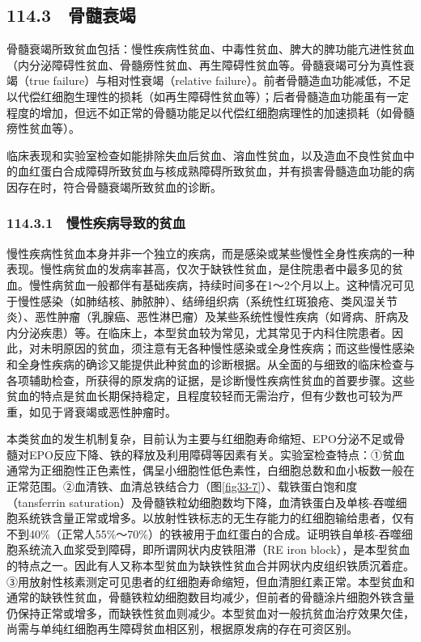 \subsection{114.3　骨髓衰竭}

骨髓衰竭所致贫血包括：慢性疾病性贫血、中毒性贫血、脾大的脾功能亢进性贫血（内分泌障碍性贫血、骨髓痨性贫血、再生障碍性贫血等。骨髓衰竭可分为真性衰竭（true
failure）与相对性衰竭（relative
failure）。前者骨髓造血功能减低，不足以代偿红细胞生理性的损耗（如再生障碍性贫血等）；后者骨髓造血功能虽有一定程度的增加，但远不如正常的骨髓功能足以代偿红细胞病理性的加速损耗（如骨髓痨性贫血等）。

临床表现和实验室检查如能排除失血后贫血、溶血性贫血，以及造血不良性贫血中的血红蛋白合成障碍所致贫血与核成熟障碍所致贫血，并有损害骨髓造血功能的病因存在时，符合骨髓衰竭所致贫血的诊断。

\subsubsection{114.3.1　慢性疾病导致的贫血}

慢性疾病性贫血本身并非一个独立的疾病，而是感染或某些慢性全身性疾病的一种表现。慢性病贫血的发病率甚高，仅次于缺铁性贫血，是住院患者中最多见的贫血。慢性病贫血一般都伴有基础疾病，持续时间多在1～2个月以上。这种情况可见于慢性感染（如肺结核、肺脓肿）、结缔组织病（系统性红斑狼疮、类风湿关节炎）、恶性肿瘤（乳腺癌、恶性淋巴瘤）及某些系统性慢性疾病（如肾病、肝病及内分泌疾患）等。在临床上，本型贫血较为常见，尤其常见于内科住院患者。因此，对未明原因的贫血，须注意有无各种慢性感染或全身性疾病；而这些慢性感染和全身性疾病的确诊又能提供此种贫血的诊断根据。从全面的与细致的临床检查与各项辅助检查，所获得的原发病的证据，是诊断慢性疾病性贫血的首要步骤。这些贫血的特点是贫血长期保持稳定，且程度较轻而无需治疗，但有少数也可较为严重，如见于肾衰竭或恶性肿瘤时。

本类贫血的发生机制复杂，目前认为主要与红细胞寿命缩短、EPO分泌不足或骨髓对EPO反应下降、铁的释放及利用障碍等因素有关。实验室检查特点：①贫血通常为正细胞性正色素性，偶呈小细胞性低色素性，白细胞总数和血小板数一般在正常范围。②血清铁、血清总铁结合力（图\ref{fig33-7}）、载铁蛋白饱和度（tansferrin
saturation）及骨髓铁粒幼细胞数均下降，血清铁蛋白及单核-吞噬细胞系统铁含量正常或增多。以放射性铁标志的无生存能力的红细胞输给患者，仅有不到40\%（正常人55\%～70\%）的铁被用于血红蛋白的合成。证明铁自单核-吞噬细胞系统流入血浆受到障碍，即所谓网状内皮铁阻滞（RE
iron
block），是本型贫血的特点之一。因此有人又称本型贫血为缺铁性贫血合并网状内皮组织铁质沉着症。③用放射性核素测定可见患者的红细胞寿命缩短，但血清胆红素正常。本型贫血和通常的缺铁性贫血，骨髓铁粒幼细胞数目均减少，但前者的骨髓涂片细胞外铁含量仍保持正常或增多，而缺铁性贫血则减少。本型贫血对一般抗贫血治疗效果欠佳，尚需与单纯红细胞再生障碍贫血相区别，根据原发病的存在可资区别。


